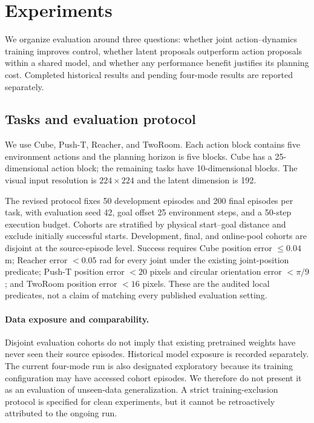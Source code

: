 \section{Experiments}
\label{sec:experiments}

We organize evaluation around three questions: whether joint action--dynamics training improves control, whether latent proposals outperform action proposals within a shared model, and whether any performance benefit justifies its planning cost. Completed historical results and pending four-mode results are reported separately.

\subsection{Tasks and evaluation protocol}

We use Cube, Push-T, Reacher, and TwoRoom. Each action block contains five environment actions and the planning horizon is five blocks. Cube has a 25-dimensional action block; the remaining tasks have 10-dimensional blocks. The visual input resolution is $224\times224$ and the latent dimension is 192.

The revised protocol fixes 50 development episodes and 200 final episodes per task, with evaluation seed 42, goal offset 25 environment steps, and a 50-step execution budget. Cohorts are stratified by physical start--goal distance and exclude initially successful starts. Development, final, and online-pool cohorts are disjoint at the source-episode level.
Success requires Cube position error $\leq0.04$ m; Reacher error $<0.05$ rad for every joint under the existing joint-position predicate; Push-T position error $<20$ pixels and circular orientation error $<\pi/9$; and TwoRoom position error $<16$ pixels. These are the audited local predicates, not a claim of matching every published evaluation setting.

\paragraph{Data exposure and comparability.}
Disjoint evaluation cohorts do not imply that existing pretrained weights have never seen their source episodes. Historical model exposure is recorded separately. The current four-mode run is also designated exploratory because its training configuration may have accessed cohort episodes. We therefore do not present it as an evaluation of unseen-data generalization. A strict training-exclusion protocol is specified for clean experiments, but it cannot be retroactively attributed to the ongoing run.

